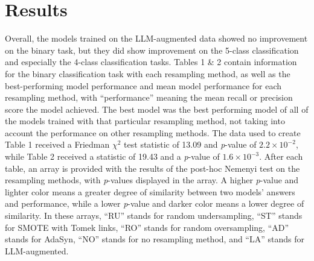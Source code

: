 \documentclass[runningheads]{llncs}
\begin{document}
{\parskip=0pt
\section{Results}
Overall, the models trained on the LLM-augmented data showed no improvement on the binary task, but they did show improvement on the 5-class classification and especially the 4-class classification tasks. Tables 1 \& 2 contain information for the binary classification task with each resampling method, as well as the best-performing model performance and mean model performance for each resampling method, with ``performance'' meaning the mean recall or precision score the model achieved. The best model was the best performing model of all of the models trained with that particular resampling method, not taking into account the performance on other resampling methods. The data used to create Table 1 received a Friedman $\chi^2$ test statistic of 13.09 and \emph{p}-value of $2.2 \times 10^{-2}$, while Table 2 received a statistic of 19.43 and a \emph{p}-value of $1.6 \times 10^{-3}$. After each table, an array is provided with the results of the post-hoc Nemenyi test on the resampling methods, with \emph{p}-values displayed in the array. A higher \emph{p}-value and lighter color means a greater degree of similarity between two models' answers and performance, while a lower \emph{p}-value and darker color means a lower degree of similarity. In these arrays, ``RU'' stands for random undersampling, ``ST'' stands for SMOTE with Tomek links, ``RO'' stands for random oversampling, ``AD'' stands for AdaSyn, ``NO'' stands for no resampling method, and ``LA'' stands for LLM-augmented.}
\end{document}
